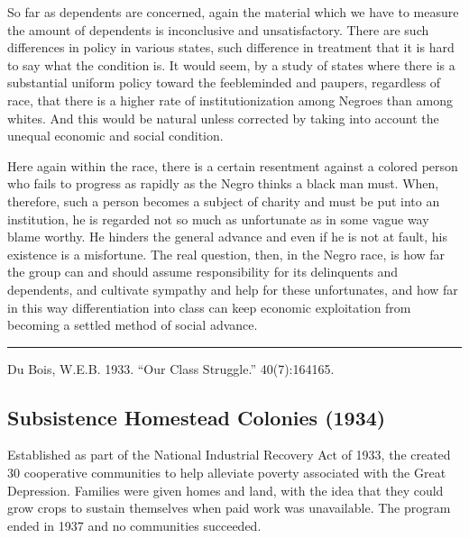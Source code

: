 \documentclass[letterpaper,10pt,english]{jupyterBook}
\begin{document}
\sphinxAtStartPar
So far as dependents are concerned, again the material which we have to measure the amount of dependents is inconclusive and unsatisfactory. There are such differences in policy in various states, such difference in treatment that it is hard to say what the condition is. It would seem, by a study of states where there is a substantial uniform  policy toward the feeble\sphinxhyphen{}minded and paupers, regardless of race, that there is a higher rate of institutionization among Negroes than among whites. And this would be natural unless corrected by taking into account the unequal economic and social condition.

\sphinxAtStartPar
Here again within the race, there is a certain resentment against a colored person who fails to progress as rapidly as the Negro thinks a black man must. When, therefore, such a person becomes a subject of charity and must be put into an institution, he is regarded not so much as unfortunate as in some vague way blame worthy. He hinders the general advance and even if he is not at fault, his existence is a misfortune. The real question, then, in the Negro race, is how far the group can and should assume responsibility for its delinquents and dependents, and cultivate sympathy and help for these unfortunates, and how far in this way differentiation into class can keep economic exploitation from becoming a settled method of social advance.


\bigskip\hrule\bigskip


\sphinxAtStartPar
{} Du Bois, W.E.B. 1933. “Our Class Struggle.”  40(7):164\sphinxhyphen{}165.


\subsection{Subsistence Homestead Colonies (1934)}
\label{\detokenize{Volumes/41/03/Subsistence_homestead_colonies:subsistence-homestead-colonies-1934}}\label{\detokenize{Volumes/41/03/Subsistence_homestead_colonies::doc}}
\begin{sphinxShadowBox}
\sphinxstylesidebartitle{}

\sphinxAtStartPar
{}
\end{sphinxShadowBox}

\begin{sphinxShadowBox}
\sphinxstylesidebartitle{}

\sphinxAtStartPar
Established as part of the National Industrial Recovery Act of 1933, the  created 30 cooperative communities to help alleviate poverty associated with the Great Depression. Families were given homes and land, with the idea that they could grow crops to sustain themselves when paid work was unavailable. The program ended in 1937 and no communities succeeded.
\end{sphinxShadowBox}
\end{document}
